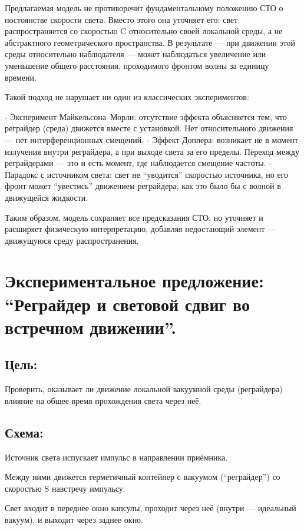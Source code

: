 \documentclass[12pt]{article}
\begin{document}
Предлагаемая модель не противоречит фундаментальному положению СТО о постоянстве скорости света. Вместо этого она уточняет его: свет распространяется со скоростью C относительно своей локальной среды, а не абстрактного геометрического пространства. В результате — при движении этой среды относительно наблюдателя — может наблюдаться увеличение или уменьшение общего расстояния, проходимого фронтом волны за единицу времени.

Такой подход не нарушает ни один из классических экспериментов:

- Эксперимент Майкельсона–Морли: отсутствие эффекта объясняется тем, что реграйдер (среда) движется вместе с установкой. Нет относительного движения — нет интерференционных смещений.
- Эффект Доплера: возникает не в момент излучения внутри реграйдера, а при выходе света за его пределы. Переход между реграйдерами — это и есть момент, где наблюдается смещение частоты.
- Парадокс с источником света: свет не “уводится” скоростью источника, но его фронт может “увестись” движением реграйдера, как это было бы с волной в движущейся жидкости.

Таким образом, модель сохраняет все предсказания СТО, но уточняет и расширяет физическую интерпретацию, добавляя недостающий элемент — движущуюся среду распространения.

\section*{Экспериментальное предложение: “Реграйдер и световой сдвиг во встречном движении”.}

\subsection*{Цель:}
Проверить, оказывает ли движение локальной вакуумной среды (реграйдера) влияние на общее время прохождения света через неё.

\subsection*{Схема:}
Источник света испускает импульс в направлении приёмника.

Между ними движется герметичный контейнер с вакуумом (“реграйдер”) со скоростью S навстречу импульсу.

Свет входит в переднее окно капсулы, проходит через неё (внутри — идеальный вакуум), и выходит через заднее окно.
\end{document}
